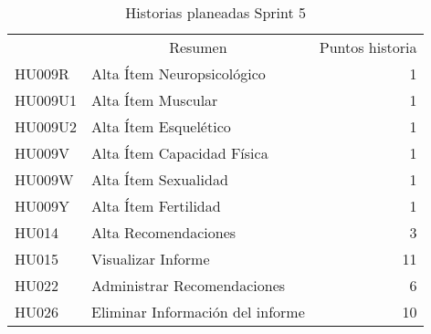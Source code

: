 \begin{table}[!h]
\centering
\caption{Historias planeadas Sprint 5}
\label{historiasSprint5}
\begin{tabular}{llr}
\rowcolor[HTML]{C0C0C0} 
\multicolumn{1}{c}{\cellcolor[HTML]{C0C0C0}Identificador} & \multicolumn{1}{c}{\cellcolor[HTML]{C0C0C0}Resumen} & \multicolumn{1}{c}{\cellcolor[HTML]{C0C0C0}Puntos historia} \\
HU009R														& Alta Ítem Neuropsicológico									& 1                                                          \\
\rowcolor[HTML]{EFEFEF} 
HU009U1														& Alta Ítem Muscular											& 1                                                           \\
HU009U2														& Alta Ítem Esquelético											& 1                                                          \\
\rowcolor[HTML]{EFEFEF} 
HU009V														& Alta Ítem Capacidad Física									& 1                                                          
\\
HU009W														& Alta Ítem Sexualidad											& 1                                                          
\\
\rowcolor[HTML]{EFEFEF} 
HU009Y														& Alta Ítem Fertilidad											& 1
\\
HU014														& Alta Recomendaciones											& 3
\\
\rowcolor[HTML]{EFEFEF} 
HU015														& Visualizar Informe											& 11                                                          
\\
HU022														& Administrar Recomendaciones									& 6                                                          
\\
\rowcolor[HTML]{EFEFEF} 
HU026														& Eliminar Información del informe								& 10
\\
\end{tabular}
\end{table}

